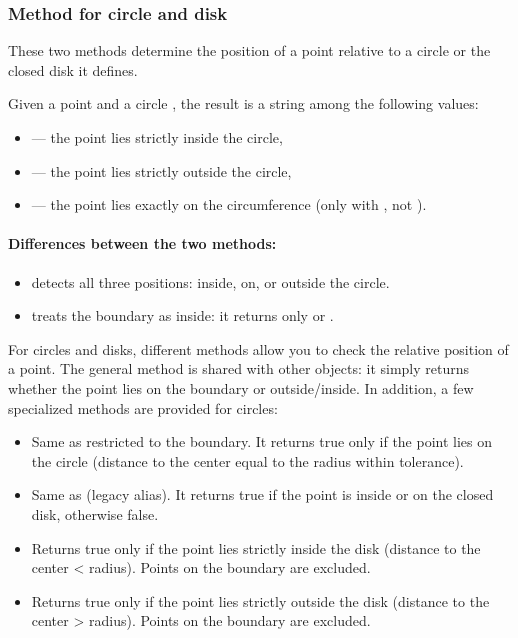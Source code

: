 \subsubsection{Method  for circle and disk}
\label{ssub:in_out_for_circle_and_disk}

These two methods determine the position of a point relative to a circle or the closed disk it defines.

\medskip
\noindent
Given a point and a circle , the result is a string among the following values:
\begin{itemize}
  \item {} — the point lies strictly inside the circle,
  \item {} — the point lies strictly outside the circle,
  \item {} — the point lies exactly on the circumference (only with , not ).
\end{itemize}

\paragraph{Differences between the two methods:}
\begin{itemize}
  \item {} detects all three positions: inside, on, or outside the circle.
  \item {} treats the boundary as inside: it returns only  or .
\end{itemize}

For circles and disks, different methods allow you to check the relative position of a point.
The general method  is shared with other objects: it simply returns whether the point lies on the boundary or outside/inside.
In addition, a few specialized methods are provided for circles:

\begin{itemize}
 \item {} Same as    restricted to the boundary.
 It returns true only if the point lies on the circle (distance to the center equal to the radius within tolerance).
 \item {}   Same as  (legacy alias).
 It returns true if the point is inside or on the closed disk, otherwise false.
 \item {}   Returns true only if the point lies strictly inside the disk (distance to the center < radius). Points on the boundary are excluded.
 \item {}   Returns true only if the point lies strictly outside the disk (distance to the center > radius).
 Points on the boundary are excluded.
\end{itemize}

